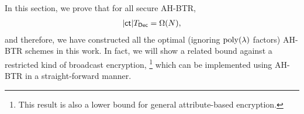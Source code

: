 In this section, we prove that for all secure AH-BTR,
\begin{align*}
|\ct|\TDec=\Omega(N),
\end{align*}
and therefore, we have constructed all the optimal (ignoring $\operatorname{poly}(\lambda)$ factors) AH-BTR schemes in this work.
In fact, we will show a related bound against a restricted kind of broadcast encryption,%
\footnote{This result is also a lower bound for general attribute-based encryption.}
which can be implemented using AH-BTR in a straight-forward manner.
